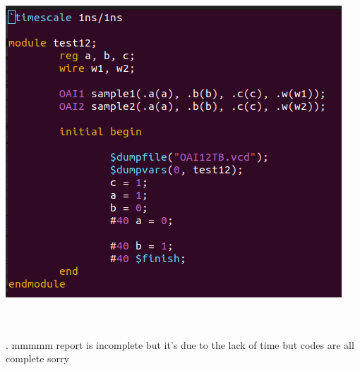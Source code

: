 \begin{landscape}
\vspace*{-5.5cm}
\hspace*{7.5cm}\includegraphics[width = 0.5 \linewidth]{OAI4.png}
\hspace*{2cm}
\end{landscape}
	
\\\;
\\. 
mmmmm report is incomplete but it's due to the lack of time 
but codes are all complete
sorry








